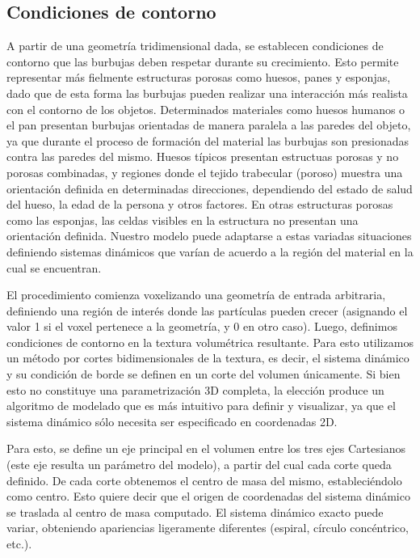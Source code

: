 \subsection{Condiciones de contorno}
A partir de una geometría tridimensional dada, se establecen condiciones de contorno que las burbujas deben respetar durante su crecimiento.
Esto permite representar más fielmente estructuras porosas como huesos, panes y esponjas, dado que de esta forma las burbujas pueden realizar una interacción más realista con el contorno de los objetos.
Determinados materiales como huesos humanos o el pan presentan burbujas orientadas de manera paralela a las paredes del objeto, ya que durante el proceso de formación del material las burbujas son presionadas contra las paredes del mismo.
Huesos típicos presentan estructuas porosas y no porosas combinadas, y regiones donde el tejido trabecular (poroso) muestra una orientación definida en determinadas direcciones, dependiendo del estado de salud del hueso, la edad de la persona y otros factores.
En otras estructuras porosas como las esponjas, las celdas visibles en la estructura no presentan una orientación definida.
Nuestro modelo puede adaptarse a estas variadas situaciones definiendo sistemas dinámicos que varían de acuerdo a la región del material en la cual se encuentran.

El procedimiento comienza voxelizando una geometría de entrada arbitraria, definiendo una región de interés donde las partículas pueden crecer (asignando el valor 1 si el voxel pertenece a la geometría, y 0 en otro caso).
Luego, definimos condiciones de contorno en la textura volumétrica resultante.
Para esto utilizamos un método por cortes bidimensionales de la textura, es decir, el sistema dinámico y su condición de borde se definen en un corte del volumen únicamente.
Si bien esto no constituye una parametrización 3D completa, la elección produce un algoritmo de modelado que es más intuitivo para definir y visualizar, ya que el sistema dinámico sólo necesita ser especificado en coordenadas 2D.

Para esto, se define un eje principal en el volumen entre los tres ejes Cartesianos (este eje resulta un parámetro del modelo), a partir del cual cada corte queda definido.
De cada corte obtenemos el centro de masa del mismo, estableciéndolo como centro.
Esto quiere decir que el origen de coordenadas del sistema dinámico se traslada al centro de masa computado.
El sistema dinámico exacto puede variar, obteniendo apariencias ligeramente diferentes (espiral, círculo concéntrico, etc.).

